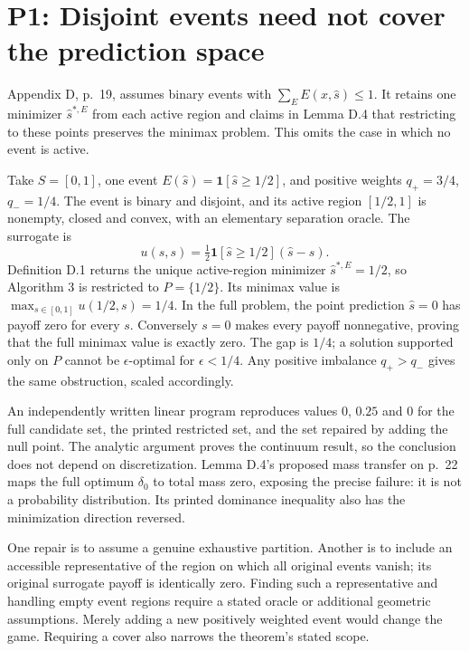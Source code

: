 \documentclass[10pt]{article}
\begin{document}
\section*{P1: Disjoint events need not cover the prediction space}
Appendix D, p. 19, assumes binary events with \(\sum_E E(x,\widehat s)\leq1\). It retains one minimizer \(\widehat s^{*,E}\) from each active region and claims in Lemma D.4 that restricting to these points preserves the minimax problem. This omits the case in which no event is active.\par
Take \(S=[0,1]\), one event \(E(\widehat s)=\mathbf1[\widehat s\geq1/2]\), and positive weights \(q_+=3/4\), \(q_-=1/4\). The event is binary and disjoint, and its active region \([1/2,1]\) is nonempty, closed and convex, with an elementary separation oracle. The surrogate is \[u(\widehat s,s)=\tfrac12\mathbf1[\widehat s\geq1/2](\widehat s-s).\] Definition D.1 returns the unique active-region minimizer \(\widehat s^{*,E}=1/2\), so Algorithm 3 is restricted to \(P=\{1/2\}\). Its minimax value is \(\max_{s\in[0,1]}u(1/2,s)=1/4\). In the full problem, the point prediction \(\widehat s=0\) has payoff zero for every \(s\). Conversely \(s=0\) makes every payoff nonnegative, proving that the full minimax value is exactly zero. The gap is \(1/4\); a solution supported only on \(P\) cannot be \(\epsilon\)-optimal for \(\epsilon<1/4\). Any positive imbalance \(q_+>q_-\) gives the same obstruction, scaled accordingly.\par
An independently written linear program reproduces values \(0\), \(0.25\) and \(0\) for the full candidate set, the printed restricted set, and the set repaired by adding the null point. The analytic argument proves the continuum result, so the conclusion does not depend on discretization. Lemma D.4’s proposed mass transfer on p. 22 maps the full optimum \(\delta_0\) to total mass zero, exposing the precise failure: it is not a probability distribution. Its printed dominance inequality also has the minimization direction reversed.\par
One repair is to assume a genuine exhaustive partition. Another is to include an accessible representative of the region on which all original events vanish; its original surrogate payoff is identically zero. Finding such a representative and handling empty event regions require a stated oracle or additional geometric assumptions. Merely adding a new positively weighted event would change the game. Requiring a cover also narrows the theorem’s stated scope.\par
\end{document}
